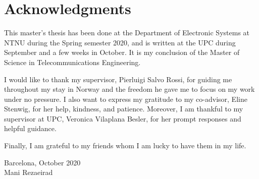 \cleardoublepage{}
\chapter*{Acknowledgments}

This master's thesis has been done at the Department of Electronic Systems at \acrfull{NTNU} during the Spring semester 2020, and is written at the \acrfull{UPC} during September and a few weeks in October. It is my conclusion of the Master of Science in Telecommunications Engineering.

I would like to thank my supervisor, Pierluigi Salvo Rossi, for guiding me throughout my stay in Norway and the freedom he gave me to focus on my work under no pressure. I also want to express my gratitude to my co-advisor, Eline Stenwig, for her help, kindness, and patience. Moreover, I am thankful to my supervisor at \acrshort{UPC}, Veronica Vilaplana Besler, for her prompt responses and helpful guidance.

Finally, I am grateful to my friends whom I am lucky to have them in my life.

\vspace{1cm}

Barcelona, October 2020\\[6pt]
Mani Rezaeirad

